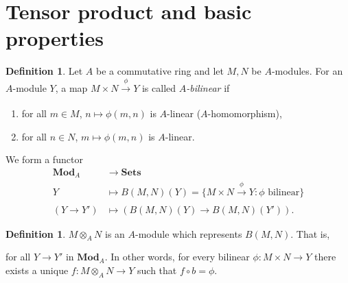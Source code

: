 \documentclass[12pt]{report}
\theoremstyle{plain}
\theoremstyle{remark}
\theoremstyle{definition}
\newtheorem{definition}[theorem]{Definition}
\newcommand{\Hom}[3]{\mathrm{Hom}_{#3}(#1,#2)}
\begin{document}
\section{Tensor product and basic properties}
\begin{definition}
    Let $A$ be a commutative ring and let $M,N$ be $A$-modules. For an $A$-module $Y$, a map $M\times N\xrightarrow[]{\phi}Y$ is called \emph{$A$-bilinear} if
    \begin{enumerate}
        \item for all $m\in M$, $n\mapsto \phi(m,n)$ is $A$-linear ($A$-homomorphism),
        \item for all $n\in N$, $m\mapsto \phi(m,n)$ is $A$-linear.
    \end{enumerate}
    We form a functor
    \begin{align*}
        \mathbf{Mod}_A &\to \mathbf{Sets} \\
        Y &\mapsto B(M,N)(Y)=\{M\times N\xrightarrow[]{\phi}Y:\phi\text{ bilinear}\} \\
        (Y\to Y') &\mapsto (B(M,N)(Y)\to B(M,N)(Y')).
    \end{align*}
\end{definition}

\begin{definition}
    $M\otimes_A N$ is an $A$-module which represents $B(M,N)$. That is,
    \begin{figure}[H]
        \centering
    \end{figure}
    \noindent for all $Y\to Y'$ in $\mathbf{Mod}_A$. In other words, for every bilinear $\phi:M\times N\to Y$ there exists a unique $f:M\otimes_A N\to Y$ such that $f\circ b=\phi$.
    \begin{figure}[H]
        \centering
    \end{figure}
\end{definition}
\end{document}
